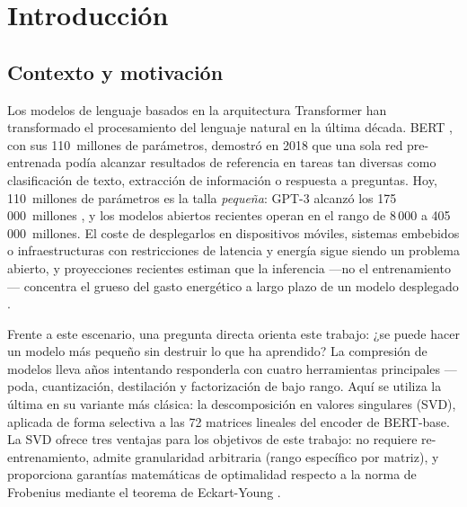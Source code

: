 
\section{Introducción}
\label{sec:introduccion}

\subsection{Contexto y motivación}
\label{sec:contexto-motivacion}

Los modelos de lenguaje basados en la arquitectura Transformer
\cite{vaswani2017attention} han transformado el procesamiento del lenguaje natural
en la última década. BERT \cite{devlin2019bert}, con sus 110~millones de parámetros,
demostró en 2018 que una sola red pre-entrenada podía alcanzar resultados de
referencia en tareas tan diversas como clasificación de texto, extracción de
información o respuesta a preguntas. Hoy, 110~millones de parámetros es la talla
\emph{pequeña}: GPT-3 alcanzó los 175\,000~millones \cite{brown2020language}, y los
modelos abiertos recientes operan en el rango de 8\,000 a 405\,000~millones. El coste
de desplegarlos en dispositivos móviles, sistemas embebidos o infraestructuras con
restricciones de latencia y energía sigue siendo un problema abierto, y proyecciones
recientes estiman que la inferencia ---no el entrenamiento--- concentra el grueso del
gasto energético a largo plazo de un modelo desplegado \cite{strubell2019energy,
schwartz2020green}.

Frente a este escenario, una pregunta directa orienta este trabajo: ¿se puede hacer
un modelo más pequeño sin destruir lo que ha aprendido? La compresión de modelos
lleva años intentando responderla con cuatro herramientas principales ---poda,
cuantización, destilación y factorización de bajo rango. Aquí se utiliza la última
en su variante más clásica: la descomposición en valores singulares (SVD), aplicada
de forma selectiva a las 72 matrices lineales del encoder de BERT-base. La SVD
ofrece tres ventajas para los objetivos de este trabajo: no requiere
re-entrenamiento, admite granularidad arbitraria (rango específico por matriz), y
proporciona garantías matemáticas de optimalidad respecto a la norma de Frobenius
mediante el teorema de Eckart-Young \cite{eckart1936approximation}.

